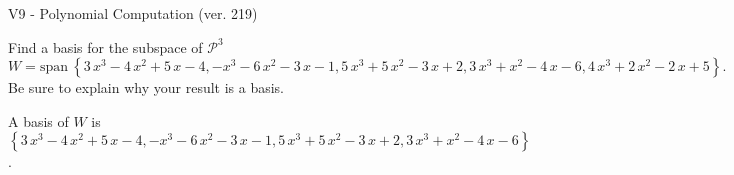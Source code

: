 \begin{exercise}
  \begin{exerciseTitle}V9 - Polynomial Computation (ver. 219)\end{exerciseTitle}
  \begin{exerciseStatement}
    Find a basis for the subspace of \(\mathcal{P}^3\) 
\[W=\mathrm{span}\ \left\{3 \, x^{3} - 4 \, x^{2} + 5 \, x - 4 , -x^{3} - 6 \, x^{2} - 3 \, x - 1 , 5 \, x^{3} + 5 \, x^{2} - 3 \, x + 2 , 3 \, x^{3} + x^{2} - 4 \, x - 6 , 4 \, x^{3} + 2 \, x^{2} - 2 \, x + 5\right\}.\]
 Be sure to explain why your result is a basis.


  \end{exerciseStatement}
  \begin{exerciseAnswer}
   A basis of \(W\) is  \(\left\{3 \, x^{3} - 4 \, x^{2} + 5 \, x - 4 , -x^{3} - 6 \, x^{2} - 3 \, x - 1 , 5 \, x^{3} + 5 \, x^{2} - 3 \, x + 2 , 3 \, x^{3} + x^{2} - 4 \, x - 6\right\}\).
  


  \end{exerciseAnswer}
\end{exercise}